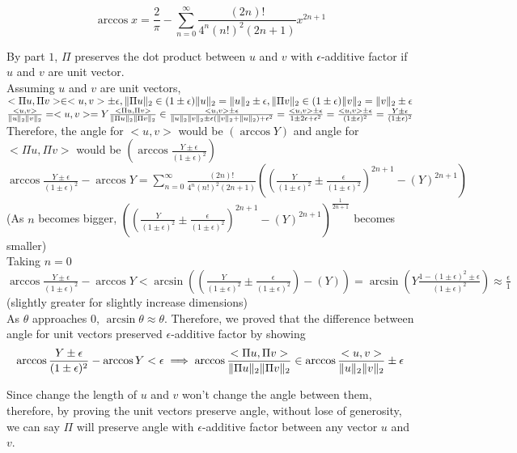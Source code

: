 \documentclass[11pt]{article}
\begin{document}
\begin{solution}
\begin{enumerate}
    $$ \arccos {x} = \frac{2}{\pi} -  \sum_{n=0}^{\infty}\frac{(2n)!}{4^n(n!)^2(2n+1)}x^{2n+1} $$
    
    By part $1$, $\Pi$ preserves the dot product between $u$ and $v$ with $\epsilon$-additive factor if $u$ and $v$ are unit vector.\\
    
    Assuming $u$ and $v$ are unit vectors, $<\Pi u, \Pi v> \in <u,v> \pm\epsilon, \mathopen\| \Pi u \mathclose\|_2 \in (1\pm\epsilon)\mathopen\| u \mathclose\|_2 = \mathopen\| u \mathclose\|_2 \pm \epsilon, \mathopen\| \Pi v \mathclose\|_2 \in (1\pm\epsilon)\mathopen\| v \mathclose\|_2 = \mathopen\| v \mathclose\|_2 \pm \epsilon$\\
    
    $\frac{<u, v>}{\mathopen\| u \mathclose\|_2\mathopen\| v \mathclose\|_2} = <u,v> = Y \\
    \frac{<\Pi u, \Pi v>}{\mathopen\| \Pi u \mathclose\|_2\mathopen\| \Pi v \mathclose\|_2} \in \frac{<u, v>\pm\epsilon}{\mathopen\| u \mathclose\|_2\mathopen\| v \mathclose\|_2 \pm \epsilon(\mathopen\| v \mathclose\|_2+\mathopen\| u \mathclose\|_2)+\epsilon^2} = \frac{<u, v>\pm\epsilon}{1 \pm 2\epsilon + \epsilon^2} = \frac{<u,v> \pm \epsilon}{(1\pm\epsilon)^2} = \frac{Y\pm\epsilon}{(1\pm\epsilon)^2}$\\
    
    Therefore, the angle for $<u,v>$ would be $(\arccos{Y})$ and angle for $<\Pi u, \Pi v>$ would be $(\arccos{\frac{Y\pm\epsilon}{(1\pm\epsilon)^2}})$\\
    
    $\arccos{\frac{Y\pm\epsilon}{(1\pm\epsilon)^2}} - \arccos{Y} = \sum_{n=0}^{\infty}\frac{(2n)!}{4^n(n!)^2(2n+1)}((\frac{Y}{(1\pm\epsilon)^2}\pm \frac{\epsilon}{(1\pm\epsilon)^2})^{2n+1} - (Y)^{2n+1})$ \\
    
    (As $n$ becomes bigger, $((\frac{Y}{(1\pm\epsilon)^2}\pm \frac{\epsilon}{(1\pm\epsilon)^2})^{2n+1} - (Y)^{2n+1})^\frac{1}{2n+1}$ becomes smaller)\\
    
    Taking $n = 0$\\
    $ \arccos{\frac{Y\pm\epsilon}{(1\pm\epsilon)^2}} - \arccos{Y} < \arcsin {((\frac{Y}{(1\pm\epsilon)^2}\pm \frac{\epsilon}{(1\pm\epsilon)^2}) - (Y))} = \arcsin(Y\frac{1 - (1\pm\epsilon)^2 \pm \epsilon}{(1\pm\epsilon)^2}) \approx \frac{\epsilon}{1}$ (slightly greater for slightly increase dimensions)\\ 
    
    As $\theta$ approaches $0$, $\arcsin{\theta} \approx \theta$. Therefore, we proved that the difference between angle for unit vectors preserved $\epsilon$-additive factor by showing 
    $$ \arccos{\frac{Y\pm\epsilon}{(1\pm\epsilon)^2}} - \arccos{Y} < \epsilon \implies \arccos\frac{<\Pi u, \Pi v>}{\mathopen\| \Pi u \mathclose\|_2\mathopen\| \Pi v \mathclose\|_2} \in \arccos\frac{<u, v>}{\mathopen\| u \mathclose\|_2\mathopen\| v \mathclose\|_2} \pm\epsilon$$

    Since change the length of $u$ and $v$ won't change the angle between them, therefore, by proving the unit vectors preserve angle, without lose of generosity, we can say $\Pi$ will preserve angle with $\epsilon$-additive factor between any vector $u$ and $v$.    
\end{enumerate}

\end{solution}
\end{document}

